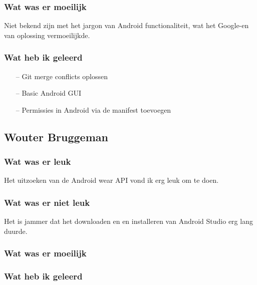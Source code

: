 \documentclass[../main.tex]{subfiles}
\begin{document}
\subsubsection{Wat was er moeilijk}
Niet bekend zijn met het jargon van Android functionaliteit, wat het Google-en van oplossing
vermoeilijkde.
\subsubsection{Wat heb ik geleerd}
\begin{itemize}
	\item[--] Git merge conflicts oplossen
	\item[--] Basic Android GUI
	\item[--] Permissies in Android via de manifest toevoegen
\end{itemize}
\newpage

\subsection{Wouter Bruggeman}
\subsubsection{Wat was er leuk}
Het uitzoeken van de Android wear API vond ik erg leuk om te doen.
\subsubsection{Wat was er niet leuk}
Het is jammer dat het downloaden en en installeren van Android Studio erg lang duurde.
\subsubsection{Wat was er moeilijk}
\subsubsection{Wat heb ik geleerd}
\newpage
\end{document}
